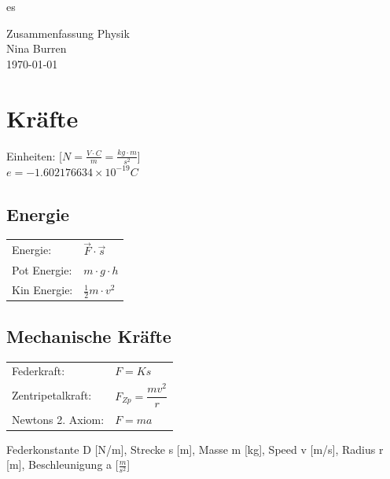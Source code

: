 es\documentclass[a4paper, fontsize=8pt, landscape]{scrartcl}
\begin{document}
\setcounter{secnumdepth}{3}

\begin{multicols*}{4}
\raggedcolumns


\begin{center}
    Zusammenfassung Physik\\
  Nina Burren\\
\today
\end{center}

\section{Kräfte}
    Einheiten: [$N= \frac{V\cdot C}{m}= \frac{kg\cdot m}{s^2}$]\\
    $e = -1.602176634 \times 10^{-19}C $

\subsection{Energie}
    \begin{tabular}[t]{@{}l l}
    
    Energie: & $\vec{F} \cdot \vec{s}$\\
    Pot Energie: &$m \cdot g \cdot h$\\
    Kin Energie: & $\frac{1}{2} m \cdot v^2$\\
    \end{tabular}
    

\subsection{Mechanische Kräfte}

    \begin{tabular}[t]{@{}l l}
    Federkraft: & $F = Ks$\\
    Zentripetalkraft: & $F_{Zp} = \dfrac{mv^2}{r}$\\
    Newtons 2. Axiom: & $F=ma$\\
  
    \end{tabular}
    \vspace{3em}
    
    \noindent
    Federkonstante D [N/m], Strecke s [m], Masse m [kg], Speed v [m/s], Radius r [m], Beschleunigung a [$\frac{m}{s^2}$]
    



\end{multicols*}
\end{document}
